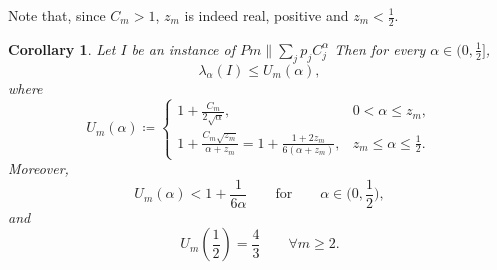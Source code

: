 \documentclass[%
english, titlepage=false %
]{./tum-templates/book/tumbook}
\newtheorem{corollary}{Corollary}
\begin{document}
Note that, since $C_m > 1$, $z_m$ is indeed real, positive and $z_m < \frac12$.

\begin{corollary}
\label{thm:main}
Let $I$ be an instance of $Pm\!\parallel\!\sum_{j} p_jC^{\alpha}_j$
Then for every $\alpha\in \Big(0,\frac12\Big]$,
\begin{equation}
 \lambda_{\alpha}(I)
 \le U_m(\alpha),
 \label{eq: lambdam Um}
\end{equation}
where
\begin{equation}
 U_m(\alpha)\coloneqq
 \begin{cases}
 \displaystyle
 1+\frac{C_m}{2\sqrt\alpha},
 &0<\alpha\le z_m,\\[3mm]
 \displaystyle
 1+\frac{C_m\sqrt{z_m}}{\alpha+z_m}
 =
 1+\frac{1+2z_m}{6(\alpha+z_m)},
 &z_m\le\alpha\le\frac12.
 \end{cases}
 \label{eq: Um}
\end{equation}
Moreover,
\[
 U_m(\alpha)<1+\frac{1}{6\alpha}
 \qquad\text{for} \qquad \alpha \in \Big(0,\frac12\Big),
\]
and
\[
 U_m\left(\frac12\right)=\frac43 \qquad \forall m\ge 2.
\]
\end{corollary}
\end{document}
